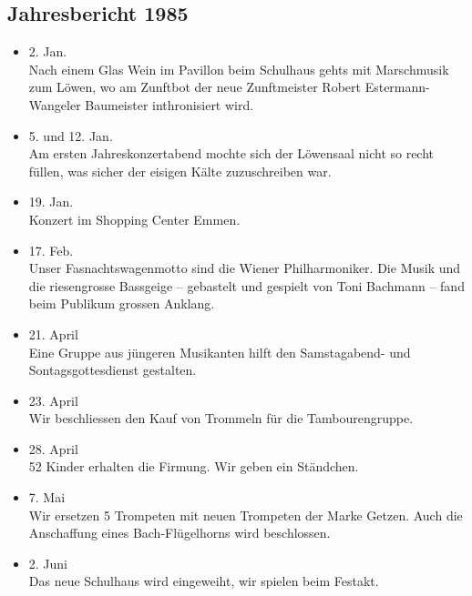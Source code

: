 \subsection{Jahresbericht 1985}

\begin{history}


    \begin{itemize}

        \item[]2. Jan.\\
        Nach einem Glas Wein im Pavillon beim Schulhaus gehts mit Marschmusik
        zum Löwen, wo am Zunftbot der neue Zunftmeister Robert
        Estermann-Wangeler Baumeister inthronisiert wird.

        \item[]5. und 12. Jan.\\
        Am ersten Jahreskonzertabend mochte sich der Löwensaal nicht so recht
        füllen, was sicher der eisigen Kälte zuzuschreiben war.

        \item[]19. Jan.\\
        Konzert im Shopping Center Emmen.

        \item[]17. Feb.\\
        Unser Fasnachtswagenmotto sind die Wiener Philharmoniker. Die Musik und
        die riesengrosse Bassgeige -- gebastelt und gespielt von Toni Bachmann
        -- fand beim Publikum grossen Anklang.

        \item[]21. April\\
        Eine Gruppe aus jüngeren Musikanten hilft den Samstagabend- und
        Sontagsgottesdienst gestalten.

        \item[]23. April\\
        Wir beschliessen den Kauf von Trommeln für die Tambourengruppe.

        \item[]28. April\\
        52 Kinder erhalten die Firmung. Wir geben ein Ständchen.

        \item[]7. Mai\\
        Wir ersetzen 5 Trompeten mit neuen Trompeten der Marke Getzen. Auch die
        Anschaffung eines Bach-Flügelhorns wird beschlossen.

        \item[]2. Juni\\
        Das neue Schulhaus wird eingeweiht, wir spielen beim Festakt.


\end{itemize}
\end{history}
